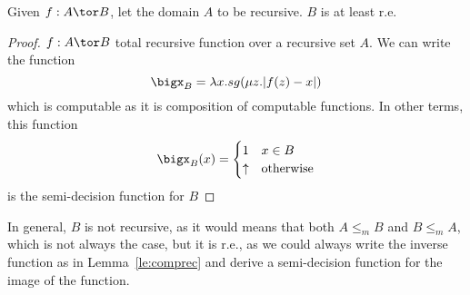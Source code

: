 \begin{lemma}\label{le:comprec}
  Given \(f : A \tor B\), let the domain \(A\) to be recursive. \(B\)
  is at least r.e.
\end{lemma}

\begin{proof}
  \(f : A \tor B\) total recursive function over a recursive set
  \(A\). We can write the function
  \[\bigx_B = \lambda x . sg(\mu z . |f(z) - x|)\] which is computable
  as it is composition of computable functions. In other terms, this
  function
  \begin{equation*}
    \bigx_B(x) =
    \begin{cases}
      1 & x \in B \\
      \uparrow & \text{otherwise}
    \end{cases}
  \end{equation*}
  is the semi-decision function for \(B\)
\end{proof}

\begin{observation}\label{obs:comprec}
  In general, \(B\) is not recursive, as it would means that both
  \(A \leq_m B\) and \(B \leq_m A\), which is not always the case, but
  it is r.e., as we could always write the inverse function as in
  Lemma~\ref{le:comprec} and derive a semi-decision function for the
  image of the function.
\end{observation}
